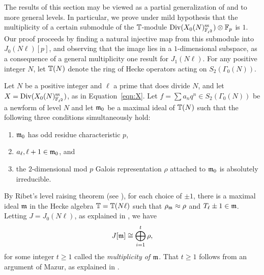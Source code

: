 \documentclass{article} \usepackage[active]{srcltx}
\DeclareMathOperator{\supersingular}{ss}
\renewcommand{\ss}{\supersingular}
\begin{document}
The results of this section may be viewed as a partial generalization
of \cite[Theorem.~2.3]{ribet:torsion} and \cite[Thm.~4.2,
Thm.~4.6]{emerton:supersingular} to more general levels.  In
particular, we prove under mild hypothesis that the multiplicity of a
certain submodule of the $\mathbb{T}$-module
$\Div(X_0(N)_{\F_{\ell^2}}^{\ss})\tensor \F_p$ is $1$.  Our proof
proceeds by finding a natural injective map from this submodule into
$J_0(N \ell)[p]$, and observing that the image lies in a
$1$-dimensional subspace, as a consequence of a general multiplicity
one result for $J_1(N\ell)$.
For any positive integer $N$, let $\mathbb{T}(N)$ denote the ring of Hecke
operators acting on $S_2(\Gamma_0(N))$.

Let $N$ be a positive integer and $\ell$ a prime that does divide $N$,
and let $X=\Div(X_0(N)_{\F_{\ell^2}}^{\ss})$, as in Equation~\eqref{eqn:X}.
Let $f=\sum a_n q^n \in S_2(\Gamma_0(N))$ be a newform of level $N$
and let $\mathfrak{m}_0$ be a maximal ideal of $\mathbb{T}(N)$ such that the following
three conditions simultaneously hold:
\begin{enumerate}
\item $\mathfrak{m}_0$ has odd residue characteristic $p$,
\item \label{hyp:ell} $a_\ell, \ell+1 \in \mathfrak{m}_0$, and
\item the $2$-dimensional mod $p$ Galois representation $\rho$
  attached to $\mathfrak{m}_0$ is absolutely irreducible.
\end{enumerate}

By Ribet's level raising theorem (see \cite{ribet:raising}), for each
choice of $\pm 1$, there is a maximal ideal $\mathfrak{m}$ in the Hecke algebra
$\mathbb{T}=\mathbb{T}(N\ell)$ such that $\rho_{\mathfrak{m}}\approx\rho$ and $T_{\ell} \pm 1\in
\mathfrak{m}$.  Letting $J=J_0(N\ell)$, as explained in
\cite[\S3.3]{ribet-stein:serre}, we have
\begin{equation}\label{eqn:mult}
J[\mathfrak{m}] \cong \bigoplus_{i=1}^t \rho,
\end{equation}
for some integer $t\geq 1$ called the {\em multiplicity of $\mathfrak{m}$}.
That $t\geq 1$ follows from an argument of
Mazur, as explained in \cite[\S3.3]{ribet-stein:serre}.


\end{document}
